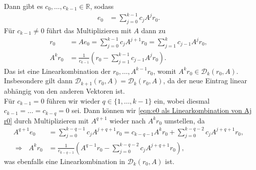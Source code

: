 \documentclass[english, parskip=full]{scrartcl}
\newcommand{\kla}{}
\begin{document}
Dann gibt es $c_0,\dots,c_{k-1}\in\mathbb{R}$, sodass
\begin{align}
e_0 &= \sum_{j=0}^{k-1}c_jA^jr_0. \label{eqn:e0 als Linearkombination von Aj r0}
\end{align}
Für $c_{k-1} \neq 0$ führt das Multiplizieren mit $A$ dann zu 
\begin{align}
r_0 &= Ae_0 = \sum_{j=0}^{k-1}c_jA^{j+1}r_0 = \sum_{j=1}^{k}c_{j-1} A^jr_0,\\
A^kr_0 &= \frac{1}{c_{k-1}}\kla\left( r_0 - \sum_{j=1}^{k-1}c_{j-1}A^jr_0 \right).
\end{align}
Das ist eine Linearkombination der $r_0, \dots, A^{k-1}r_0$, womit $A^kr_0 \in \mathcal{D}_k(r_0, A)$.
Insbesondere gilt dann $\mathcal{D}_{k+1}(r_0, A) = \mathcal{D}_k(r_0, A)$, da der neue Eintrag linear abhängig von den anderen Vektoren ist.
\\
Für $c_{k-1} = 0$ führen wir wieder $q\in\{1,\dots,k-1\}$ ein, wobei diesmal $c_{k-1} = \dots = c_{k-q} = 0$ sei.
Dann können wir \autoref{eqn:e0 als Linearkombination von Aj r0} durch Multiplizieren mit $A^{q+1}$ wieder nach $A^kr_0$ umstellen, da
\begin{align}
A^{q+1}e_0 &= \sum_{j=0}^{k-q-1}c_jA^{j+q+1}r_0 = c_{k-q-1}A^kr_0 + \sum_{j=0}^{k-q-2}c_jA^{j+q+1}r_0,\\
\Rightarrow\ \ \ A^kr_0 &= \frac{1}{c_{k-q-1}} \kla\left( A^{q-1}r_0 - \sum_{j=0}^{k-q-2}c_jA^{j+q+1}r_0 \right),
\end{align}
was ebenfalls eine Linearkombination in $\mathcal{D}_k(r_0, A)$ ist.


\end{document}

